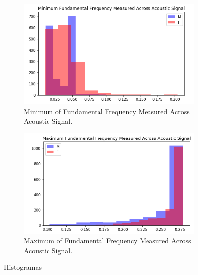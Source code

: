 \documentclass[12pt]{article}
\begin{document}
\begin{figure}[H]
	\begin{subfigure}{0.49\linewidth}
		\centering
		\includegraphics[width=\linewidth]{images/hist_min_ffma.png}
		\caption{Minimum of Fundamental Frequency Measured Across Acoustic Signal.}
		\label{fig:hist_min_ffma}
	\end{subfigure}
	\begin{subfigure}{0.49\linewidth}
		\centering
		\includegraphics[width=\linewidth]{images/hist_max_ffma.png}
		\caption{Maximum of Fundamental Frequency Measured Across Acoustic Signal.}
		\label{fig:hist_max_ffma}
	\end{subfigure}
	\hfill
	\caption{Histogramas}
\end{figure}
\end{document}
